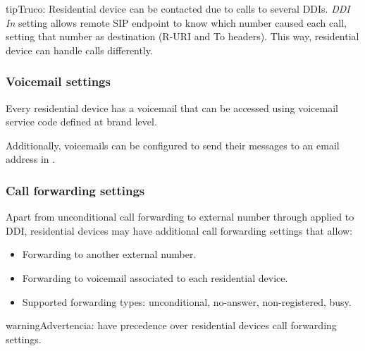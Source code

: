 \documentclass[letterpaper,10pt,spanish]{sphinxmanual}
\begin{document}
\begin{notice}{tip}{Truco:}
Residential device can be contacted due to calls to several DDIs. \emph{DDI In} setting allows remote SIP endpoint to
know which number caused each call, setting that number as destination (R-URI and To headers). This way, residential
device can handle calls differently.
\end{notice}


\subsubsection{Voicemail settings}
\label{administration_portal/client/residential/residential_devices:voicemail-settings}
Every residential device has a voicemail that can be accessed using voicemail service code defined at brand level.

Additionally, voicemails can be configured to send their messages to an email address in {\hyperref[administration_portal/client/residential/residential_voicemails:residential\string-voicemails]{}}.


\subsubsection{Call forwarding settings}
\label{administration_portal/client/residential/residential_devices:residential-devices-cfw}\label{administration_portal/client/residential/residential_devices:call-forwarding-settings}
Apart from unconditional call forwarding to external number through {\hyperref[administration_portal/client/vpbx/routing_tools/external_call_filters:external\string-call\string-filters]{}} applied to DDI,
residential devices may have additional call forwarding settings that allow:
\begin{itemize}
\item {} 
Forwarding to another external number.

\item {} 
Forwarding to voicemail associated to each residential device.

\item {} 
Supported forwarding types: unconditional, no-answer, non-registered, busy.

\end{itemize}

\begin{notice}{warning}{Advertencia:}
{\hyperref[administration_portal/client/vpbx/routing_tools/external_call_filters:external\string-call\string-filters]{}} have precedence over residential devices call forwarding settings.
\end{notice}
\end{document}

